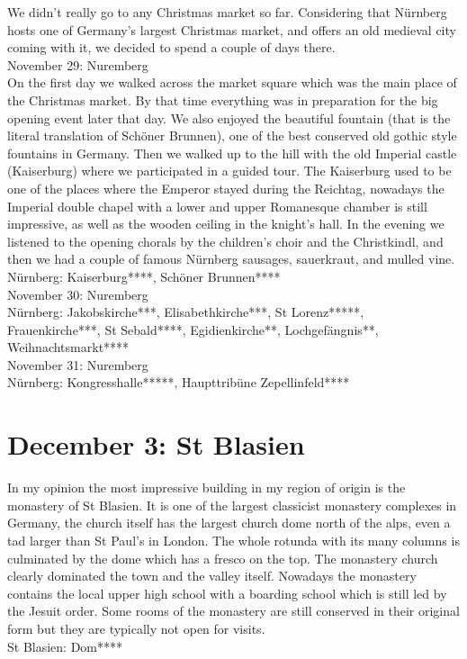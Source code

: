 We didn't really go to any Christmas market so far. Considering that N\"urnberg hosts one of Germany's largest Christmas market, and offers an old medieval city coming with it, we decided to spend a couple of days there.\\

November 29: Nuremberg\\
On the first day we walked across the market square which was the main place of the Christmas market. By that time everything was in preparation for the big opening event later that day. We also enjoyed the beautiful fountain (that is the literal translation of Sch\"oner Brunnen), one of the best conserved old gothic style fountains in Germany. Then we walked up to the hill with the old Imperial castle (Kaiserburg) where we participated in a guided tour. The Kaiserburg used to be one of the places where the Emperor stayed during the Reichtag, nowadays the Imperial double chapel with a lower and upper Romanesque chamber is still impressive, as well as the wooden ceiling in the knight's hall. In the evening we listened to the opening chorals by the children's choir and the Christkindl, and then we had a couple of famous N\"urnberg sausages, sauerkraut, and mulled vine.\\

N\"urnberg: Kaiserburg****, Sch\"oner Brunnen****\\

November 30: Nuremberg\\
N\"urnberg: Jakobskirche***, Elisabethkirche***, St Lorenz*****, Frauenkirche***, St Sebald****, Egidienkirche**, Lochgef\"angnis**, Weihnachtsmarkt****\\

November 31: Nuremberg\\
N\"urnberg: Kongresshalle*****, Haupttrib\"une Zepellinfeld****

\section{December 3: St Blasien}
\label{2008:StBlasien}

In my opinion the most impressive building in my region of origin is the monastery of St Blasien. It is one of the largest classicist monastery complexes in Germany, the church itself has the largest church dome north of the alps, even a tad larger than St Paul's in London. The whole rotunda with its many columns is culminated by the dome which has a fresco on the top. The monastery church clearly dominated the town and the valley itself. Nowadays the monastery contains the local upper high school with a boarding school which is still led by the Jesuit order. Some rooms of the monastery are still conserved in their original form but they are typically not open for visits.\\

St Blasien: Dom****
